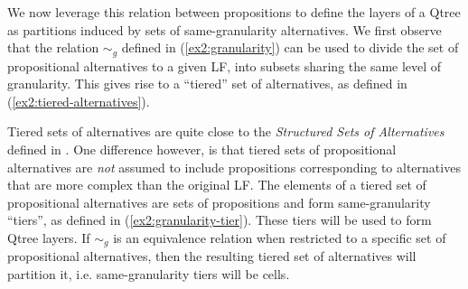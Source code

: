 We now leverage this relation between propositions to define the layers of a Qtree as partitions induced by sets of same-granularity alternatives. We first observe that the relation $\sim_g$ defined in (\ref{ex2:granularity}) can be used to divide the set of propositional alternatives to a given LF, into subsets sharing the same level of granularity. This gives rise to a ``tiered'' set of alternatives, as defined in (\ref{ex2:tiered-alternatives}). 
\begin{exe}
	 \label{ex2:tiered-alternatives}
\end{exe}

Tiered sets of alternatives are quite close to the \textit{Structured Sets of Alternatives} defined in \textcite{Ippolito2019}. One difference however, is that tiered sets of propositional alternatives are \textit{not} assumed to include propositions corresponding to alternatives that are more complex than the original LF. The elements of a tiered set of propositional alternatives are sets of propositions and form same-granularity ``tiers'', as defined in (\ref{ex2:granularity-tier}). These tiers will be used to form Qtree layers. If $\sim_g$ is an equivalence relation when restricted to a specific set of propositional alternatives, then the resulting tiered set of alternatives will partition it, i.e. same-granularity tiers will be cells.

\begin{exe}
	\label{ex2:granularity-tier}
\end{exe}

